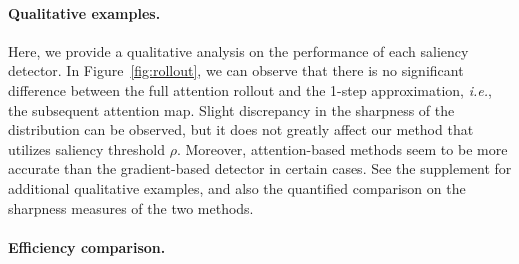 \documentclass{article}
\begin{document}
\paragraph{Qualitative examples.}
\vspace{-3mm}
Here, we provide a qualitative analysis on the performance of each saliency detector.
In Figure~\ref{fig:rollout}, we can observe that there is no significant difference between the full attention rollout and the 1-step approximation, \textit{i.e.}, the subsequent attention map.
Slight discrepancy in the sharpness of the distribution can be observed, but it does not greatly affect our method that utilizes saliency threshold $\rho$.
Moreover, attention-based methods seem to be more accurate than the gradient-based detector in certain cases.
See the supplement for additional qualitative examples, and also the quantified comparison on the sharpness measures of the two methods.
\paragraph{Efficiency comparison.}
\end{document}
